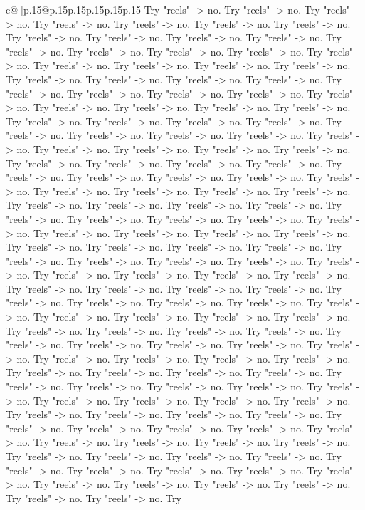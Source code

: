 \documentclass{article}
\begin{document}
{\begin{supertabular}{c@{$\;$}|p{.15\linewidth}@{}p{.15\linewidth}p{.15\linewidth}p{.15\linewidth}p{.15\linewidth}p{.15\linewidth}}
{{{Try "reels" {-}> no. Try "reels" {-}> no. Try "reels" {-}> no. Try "reels" {-}> no. Try "reels" {-}> no. Try "reels" {-}> no. Try "reels" {-}> no. Try "reels" {-}> no. Try "reels" {-}> no. Try "reels" {-}> no. Try "reels" {-}> no. Try "reels" {-}> no. Try "reels" {-}> no. Try "reels" {-}> no. Try "reels" {-}> no. Try "reels" {-}> no. Try "reels" {-}> no. Try "reels" {-}> no. Try "reels" {-}> no. Try "reels" {-}> no. Try "reels" {-}> no. Try "reels" {-}> no. Try "reels" {-}> no. Try "reels" {-}> no. Try "reels" {-}> no. Try "reels" {-}> no. Try "reels" {-}> no. Try "reels" {-}> no. Try "reels" {-}> no. Try "reels" {-}> no. Try "reels" {-}> no. Try "reels" {-}> no. Try "reels" {-}> no. Try "reels" {-}> no. Try "reels" {-}> no. Try "reels" {-}> no. Try "reels" {-}> no. Try "reels" {-}> no. Try "reels" {-}> no. Try "reels" {-}> no. Try "reels" {-}> no. Try "reels" {-}> no. Try "reels" {-}> no. Try "reels" {-}> no. Try "reels" {-}> no. Try "reels" {-}> no. Try "reels" {-}> no. Try "reels" {-}> no. Try "reels" {-}> no. Try "reels" {-}> no. Try "reels" {-}> no. Try "reels" {-}> no. Try "reels" {-}> no. Try "reels" {-}> no. Try "reels" {-}> no. Try "reels" {-}> no. Try "reels" {-}> no. Try "reels" {-}> no. Try "reels" {-}> no. Try "reels" {-}> no. Try "reels" {-}> no. Try "reels" {-}> no. Try "reels" {-}> no. Try "reels" {-}> no. Try "reels" {-}> no. Try "reels" {-}> no. Try "reels" {-}> no. Try "reels" {-}> no. Try "reels" {-}> no. Try "reels" {-}> no. Try "reels" {-}> no. Try "reels" {-}> no. Try "reels" {-}> no. Try "reels" {-}> no. Try "reels" {-}> no. Try "reels" {-}> no. Try "reels" {-}> no. Try "reels" {-}> no. Try "reels" {-}> no. Try "reels" {-}> no. Try "reels" {-}> no. Try "reels" {-}> no. Try "reels" {-}> no. Try "reels" {-}> no. Try "reels" {-}> no. Try "reels" {-}> no. Try "reels" {-}> no. Try "reels" {-}> no. Try "reels" {-}> no. Try "reels" {-}> no. Try "reels" {-}> no. Try "reels" {-}> no. Try "reels" {-}> no. Try "reels" {-}> no. Try "reels" {-}> no. Try "reels" {-}> no. Try "reels" {-}> no. Try "reels" {-}> no. Try "reels" {-}> no. Try "reels" {-}> no. Try "reels" {-}> no. Try "reels" {-}> no. Try "reels" {-}> no. Try "reels" {-}> no. Try "reels" {-}> no. Try "reels" {-}> no. Try "reels" {-}> no. Try "reels" {-}> no. Try "reels" {-}> no. Try "reels" {-}> no. Try "reels" {-}> no. Try "reels" {-}> no. Try "reels" {-}> no. Try "reels" {-}> no. Try "reels" {-}> no. Try "reels" {-}> no. Try "reels" {-}> no. Try "reels" {-}> no. Try "reels" {-}> no. Try "reels" {-}> no. Try "reels" {-}> no. Try "reels" {-}> no. Try "reels" {-}> no. Try "reels" {-}> no. Try "reels" {-}> no. Try "reels" {-}> no. Try "reels" {-}> no. Try "reels" {-}> no. Try "reels" {-}> no. Try "reels" {-}> no. Try "reels" {-}> no. Try "reels" {-}> no. Try "reels" {-}> no. Try "reels" {-}> no. Try "reels" {-}> no. Try "reels" {-}> no. Try "reels" {-}> no. Try "reels" {-}> no. Try "reels" {-}> no. Try "reels" {-}> no. Try "reels" {-}> no. Try "reels" {-}> no. Try "reels" {-}> no. Try "reels" {-}> no. Try "reels" {-}> no. Try "reels" {-}> no. Try "reels" {-}> no. Try "reels" {-}> no. Try "reels" {-}> no. Try "reels" {-}> no. Try "reels" {-}> no. Try "reels" {-}> no. Try }}}
\end{supertabular}}
\end{document}
